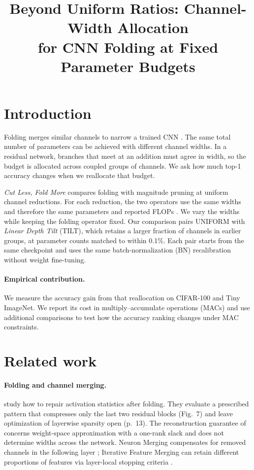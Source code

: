 \documentclass[11pt,a4paper]{article}
\title{Beyond Uniform Ratios: Channel-Width Allocation\\for CNN Folding at Fixed Parameter Budgets}
\author{}
\date{}
\newcommand{\Uniform}{UNIFORM}
\newcommand{\Tilt}{TILT}
\newcommand{\TiltName}{Linear Depth Tilt}
\begin{document}
\maketitle


\section{Introduction}
\label{sec:intro}

Folding merges similar channels to narrow a trained CNN
\citep{wang2025fold,saukh2026cut}. The same total number of parameters
can be achieved with different channel widths. In a residual network,
branches that meet at an addition must agree in width, so the budget is
allocated across coupled groups of channels. We ask how much top-1
accuracy changes when we reallocate that budget.

\emph{Cut Less, Fold More} compares folding with magnitude pruning at
uniform channel reductions. For each reduction, the two operators use
the same widths and therefore the same parameters and reported FLOPs
\citep[Figs.~1 and 8; Appendix~F.2, Table~7]{saukh2026cut}. We vary the
widths while keeping the folding operator fixed. Our comparison pairs
\Uniform{} with \emph{\TiltName{}} (\Tilt{}), which retains a larger
fraction of channels in earlier groups, at parameter counts matched to
within 0.1\%. Each pair starts from the same checkpoint and uses the
same batch-normalization (BN) recalibration without weight fine-tuning.

\paragraph{Empirical contribution.} We measure the accuracy gain from
that reallocation on CIFAR-100 and Tiny ImageNet. We report its cost in
multiply--accumulate operations (MACs) and use additional comparisons to
test how the accuracy ranking changes under MAC constraints.

\section{Related work}

\paragraph{Folding and channel merging.}
\citet{wang2025fold} study how to repair activation statistics after
folding. They evaluate a prescribed pattern that compresses only the
last two residual blocks (Fig.~7) and leave optimization of layerwise
sparsity open (p.~13). The reconstruction guarantee of
\citet{saukh2026cut} concerns weight-space approximation with a one-rank
slack and does not determine widths across the network. Neuron Merging
compensates for removed channels in the following layer
\citep{kim2020merging}; Iterative Feature Merging can retain different
proportions of features via layer-local stopping criteria
\citep[Sec.~4 and Appendix~C]{chen2023ifm}.
\end{document}
